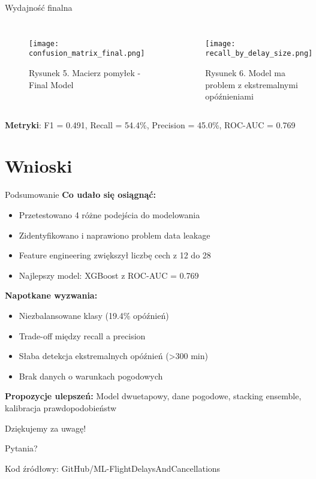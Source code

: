 \documentclass[12pt,aspectratio=169]{beamer}
\begin{document}
\begin{frame}{Wydajność finalna}
\begin{columns}
\begin{figure}
    \centering
    \texttt{[image: confusion\_matrix\_final.png]}
    \caption{Rysunek 5. Macierz pomyłek - Final Model}
\end{figure}

\begin{figure}
    \centering
    \texttt{[image: recall\_by\_delay\_size.png]}
    \caption{Rysunek 6. Model ma problem z ekstremalnymi opóźnieniami}
\end{figure}
\end{columns}

\begin{center}
\textbf{Metryki}: F1 = 0.491, Recall = 54.4\%, Precision = 45.0\%, ROC-AUC = 0.769
\end{center}
\end{frame}

\section{Wnioski}

\begin{frame}{Podsumowanie}
\textbf{Co udało się osiągnąć:}
\begin{itemize}
    \item Przetestowano 4 różne podejścia do modelowania
    \item Zidentyfikowano i naprawiono problem data leakage
    \item Feature engineering zwiększył liczbę cech z 12 do 28
    \item Najlepszy model: XGBoost z ROC-AUC = 0.769
\end{itemize}

\vspace{0.5cm}
\textbf{Napotkane wyzwania:}
\begin{itemize}
    \item Niezbalansowane klasy (19.4\% opóźnień)
    \item Trade-off między recall a precision
    \item Słaba detekcja ekstremalnych opóźnień (>300 min)
    \item Brak danych o warunkach pogodowych
\end{itemize}

\vspace{0.5cm}
\textbf{Propozycje ulepszeń:}
Model dwuetapowy, dane pogodowe, stacking ensemble, kalibracja prawdopodobieństw
\end{frame}

\begin{frame}
\begin{center}
\Huge Dziękujemy za uwagę!

\vspace{1.5cm}
\Large Pytania?

\vspace{1.5cm}
\normalsize
Kod źródłowy: GitHub/ML-FlightDelaysAndCancellations
\end{center}
\end{frame}
\end{document}
